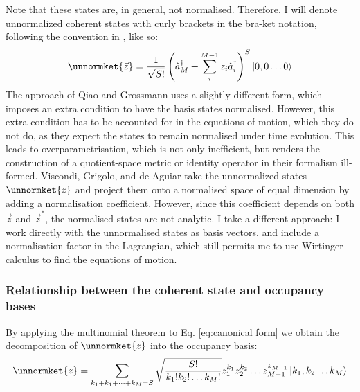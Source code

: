 \documentclass[12pt]{article}
\begin{document}
	Note that these states are, in general, not normalised. Therefore, I will denote unnormalized coherent states with curly brackets in the bra-ket notation, following the convention in \cite{Aguiar}, like so:
	\begin{equation} \label{eq:canonical form}
	\unnormket{\vec{z}}=\frac{1}{\sqrt{S!}}\left(\hat{a}^\dagger_M+\sum_i^{M-1}z_i\hat{a}^\dagger_i\right)^S\ket{0,0\dots 0}
	\end{equation}
	The approach of Qiao and Grossmann uses a slightly different form, which imposes an extra condition to have the basis states normalised. However, this extra condition has to be accounted for in the equations of motion, which they do not do, as they expect the states to remain normalised under time evolution. This leads to overparametrisation, which is not only inefficient, but renders the construction of a quotient-space metric or identity operator in their formalism ill-formed. Viscondi, Grigolo, and de Aguiar take the unnormalized states $\unnormket{z}$ and project them onto a normalised space of equal dimension by adding a normalisation coefficient. However, since this coefficient depends on both $\vec{z}$ and $\vec{z}^*$, the normalised states are not analytic. I take a different approach: I work directly with the unnormalised states as basis vectors, and include a normalisation factor in the Lagrangian, which still permits me to use Wirtinger calculus to find the equations of motion.
	\subsubsection{Relationship between the coherent state and occupancy bases}
	By applying the multinomial theorem to Eq. \ref{eq:canonical form} we obtain the decomposition of $\unnormket{z}$ into the occupancy basis:
	\begin{equation}
	\unnormket{z}=\sum_{k_1+k_1+\dots +k_M=S}\sqrt{\frac{S!}{k_1!k_2!\dots k_M!}}z_1^{k_1}z_2^{k_2}\dots z_{M-1}^{k_{M-1}}\ket{k_1,k_2\dots k_M}
	\end{equation}
	
\end{document}
